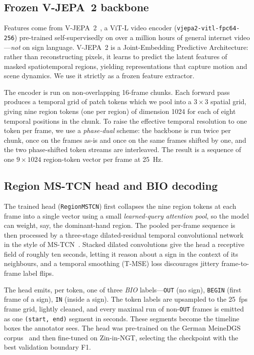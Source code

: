 \documentclass[11pt]{article}
\begin{document}
\subsection{Frozen V-JEPA~2 backbone}
Features come from V-JEPA~2~\citep{vjepa2}, a ViT-L video encoder (\texttt{vjepa2-vitl-fpc64-256})
pre-trained self-supervisedly on over a million hours of general internet video---\emph{not} on sign
language. V-JEPA~2 is a Joint-Embedding Predictive Architecture: rather than reconstructing pixels,
it learns to predict the latent features of masked spatiotemporal regions, yielding representations
that capture motion and scene dynamics. We use it strictly as a frozen feature extractor.

The encoder is run on non-overlapping 16-frame chunks. Each forward pass produces a temporal grid of
patch tokens which we pool into a $3\times3$ spatial grid, giving nine region tokens (one per region)
of dimension 1024 for each of eight temporal positions in the chunk. To raise the effective temporal
resolution to one token per frame, we use a \emph{phase-dual} scheme: the backbone is run twice per
chunk, once on the frames as-is and once on the same frames shifted by one, and the two phase-shifted
token streams are interleaved. The result is a sequence of one $9\times1024$ region-token vector per
frame at 25~Hz.

\subsection{Region MS-TCN head and BIO decoding}
The trained head (\texttt{RegionMSTCN}) first collapses the nine region tokens at each frame into a
single vector using a small \emph{learned-query attention pool}, so the model can weight, say, the
dominant-hand region. The pooled per-frame sequence is then processed by a three-stage
dilated-residual temporal convolutional network in the style of MS-TCN~\citep{mstcn}. Stacked dilated
convolutions give the head a receptive field of roughly ten seconds, letting it reason about a sign
in the context of its neighbours, and a temporal smoothing (T-MSE) loss discourages jittery
frame-to-frame label flips.

The head emits, per token, one of three \emph{BIO} labels---\texttt{OUT} (no sign), \texttt{BEGIN}
(first frame of a sign), \texttt{IN} (inside a sign). The token labels are upsampled to the 25~fps
frame grid, lightly cleaned, and every maximal run of non-\texttt{OUT} frames is emitted as one
\texttt{(start, end)} segment in seconds. These segments become the timeline boxes the annotator
sees. The head was pre-trained on the German MeineDGS corpus~\citep{meinedgs} and then fine-tuned on
Zin-in-NGT, selecting the checkpoint with the best validation boundary F1.
\end{document}
